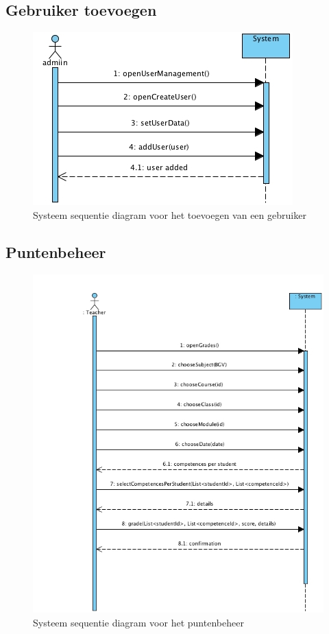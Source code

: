 \documentclass[a4paper]{article}
\begin{document}
\subsection{Gebruiker toevoegen}
\begin{figure}[H]
  \includegraphics[width=\textwidth]{addUserSSD}
  \caption{Systeem sequentie diagram voor het toevoegen van een gebruiker}
  \label{fig:SSD_addUser}
\end{figure}

\subsection{Puntenbeheer}
\begin{figure}[H]
  \includegraphics[width=\textwidth]{PuntenBeheerSSD}
  \caption{Systeem sequentie diagram voor het puntenbeheer}
  \label{fig:SSD_puntenbeheer}
\end{figure}
\end{document}

